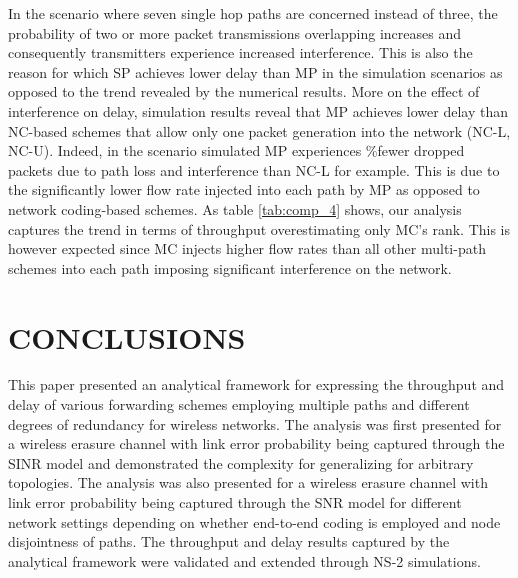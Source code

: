 \documentclass[journal, onecolumn, 12pt]{IEEEtran}
\begin{document}
In the scenario where seven single hop paths are concerned instead of three, the probability of two or more packet transmissions overlapping increases and consequently transmitters experience increased interference.
This is also the reason for which SP achieves lower delay than MP in the simulation scenarios as opposed to the trend revealed by the numerical results.
More on the effect of interference on delay, simulation results reveal that MP achieves lower delay than NC-based schemes that allow only one packet generation into the network (NC-L, NC-U).
Indeed, in the scenario simulated MP experiences \%fewer dropped packets due to path loss and interference than NC-L for example.
This is due to the significantly lower flow rate injected into each path by MP as opposed to network coding-based schemes.
As table \ref{tab:comp_4} shows, our analysis captures the trend in terms of throughput overestimating only MC's rank.
This is however expected since MC injects higher flow rates than all other multi-path schemes into each path imposing significant interference on the network.

\section{\uppercase{Conclusions}}
\label{sec:conclusions}

This paper presented an analytical framework for expressing the throughput and delay of various forwarding schemes employing multiple paths and different degrees of redundancy for wireless networks.
The analysis was first presented for a wireless erasure channel with link error probability being captured through the SINR model and demonstrated the complexity for generalizing for arbitrary topologies.
The analysis was also presented for a wireless erasure channel with link error probability being captured through the SNR model for different network settings depending on whether end-to-end coding is employed and node disjointness of paths.
The throughput and delay results captured by the analytical framework were validated and extended through NS-2 simulations.
\end{document}
